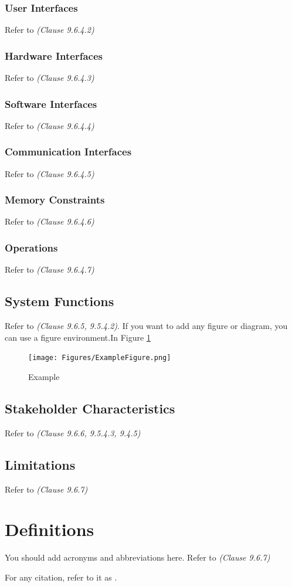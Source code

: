 \subsubsection{User Interfaces}
Refer to \textit{(Clause 9.6.4.2)}
\subsubsection{Hardware Interfaces}
Refer to \textit{(Clause 9.6.4.3)}
\subsubsection{Software Interfaces}
Refer to \textit{(Clause 9.6.4.4)}
\subsubsection{Communication Interfaces}
Refer to \textit{(Clause 9.6.4.5)}
\subsubsection{Memory Constraints}
Refer to \textit{(Clause 9.6.4.6)}
\subsubsection{Operations}
Refer to \textit{(Clause 9.6.4.7)}

\subsection{System Functions}

Refer to \textit{(Clause 9.6.5, 9.5.4.2)}. If you want to add any figure or diagram, you can use a figure environment.In Figure \ref{Fig:Example}

\begin{figure}[ht]
\centering
\texttt{[image: Figures/ExampleFigure.png]}
\caption{Example \label{Fig:Example}}
\end{figure}


\subsection{Stakeholder Characteristics}

Refer to \textit{(Clause 9.6.6, 9.5.4.3, 9.4.5)}

\subsection{Limitations}

Refer to \textit{(Clause 9.6.7)}

\section{Definitions}

You should add acronyms and abbreviations here. Refer to \textit{(Clause 9.6.7)}



For any citation, refer to it as \cite{younis2021hybrid}.
